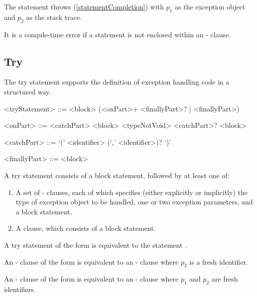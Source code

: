 \documentclass[makeidx]{article}
\begin{document}
{\LMHash{}%
The \RETHROW{} statement throws (\ref{statementCompletion}) with $p_1$ as the exception object and $p_2$ as the stack trace.

\LMHash{}%
It is a compile-time error if a \code{\RETHROW{}} statement is not enclosed within an \ON-\CATCH{} clause.


\subsection{Try}

\LMHash{}%
The try statement supports the definition of exception handling code in a structured way.

\begin{grammar}
<tryStatement> ::= \TRY{} <block> (<onPart>+ <finallyPart>? | <finallyPart>)

<onPart> ::= <catchPart> <block>
  \alt \ON{} <typeNotVoid> <catchPart>? <block>

<catchPart> ::= \CATCH{} `(' <identifier> (`,' <identifier>)? `)'

<finallyPart> ::= \FINALLY{} <block>
\end{grammar}

\LMHash{}%
A try statement consists of a block statement, followed by at least one of:
\begin{enumerate}
\item
A set of \ON{}-\CATCH{} clauses, each of which specifies (either explicitly or implicitly) the type of exception object to be handled, one or two exception parameters, and a block statement.
\item
A \FINALLY{} clause, which consists of a block statement.
\end{enumerate}


\LMHash{}%
A try statement of the form  is equivalent to the statement .

\LMHash{}%
An \ON{}-\CATCH{} clause of the form  is equivalent to an \ON{}-\CATCH{} clause  where $p_2$ is a fresh identifier.

\LMHash{}%
An \ON{}-\CATCH{} clause of the form  is equivalent to an \ON{}-\CATCH{} clause  where $p_1$ and $p_2$ are fresh identifiers.

}
\end{document}
